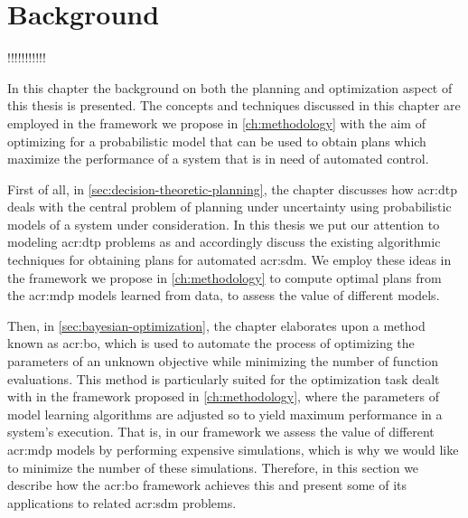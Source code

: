 \chapter{Background}
\label{ch:background}
!!!!!!!!!!!

In this chapter the background on both the planning and optimization aspect of this thesis is presented.
The concepts and techniques discussed in this chapter are employed in the framework we propose in \autoref{ch:methodology} with the aim of optimizing for a probabilistic model that can be used to obtain plans which maximize the performance of a system that is in need of automated control.

First of all, in \autoref{sec:decision-theoretic-planning}, the chapter discusses how \acrfull{acr:dtp} deals with the central problem of planning under uncertainty using probabilistic models of a system under consideration.
In this thesis we put our attention to modeling \acrshort{acr:dtp} problems as  and accordingly discuss the existing algorithmic techniques for obtaining plans for automated \acrfull{acr:sdm}.
We employ these ideas in the framework we propose in \autoref{ch:methodology} to compute optimal plans from the \acrshort{acr:mdp} models learned from data, to assess the value of different models.

Then, in \autoref{sec:bayesian-optimization}, the chapter elaborates upon a method known as \acrfull{acr:bo}, which is used to automate the process of optimizing the parameters of an unknown objective while minimizing the number of function evaluations.
This method is particularly suited for the optimization task dealt with in the framework proposed in \autoref{ch:methodology}, where the parameters of model learning algorithms are adjusted so to yield maximum performance in a system's execution.
That is, in our framework we assess the value of different \acrshort{acr:mdp} models by performing expensive simulations, which is why we would like to minimize the number of these simulations.
Therefore, in this section we describe how the \acrshort{acr:bo} framework achieves this and present some of its applications to related \acrshort{acr:sdm} problems.




\newpage


